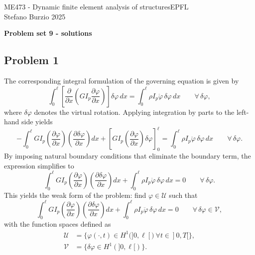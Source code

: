 \documentclass[12pt]{article}
\begin{document}
\noindent ME473 - Dynamic finite element analysis of structures\hfill EPFL\\
Stefano Burzio \hfill 2025\\
\vspace{0.3cm}

\hspace*{\fill}\textbf{\Large Problem set 9 - solutions}\hspace*{\fill}

\hrulefill

\subsection*{Problem 1}
The corresponding integral formulation of the governing equation is given by
\[
    \int_0^\ell \left[ \frac{\partial}{\partial x} \left(G I_p \frac{\partial \varphi}{\partial x} \right) \right] \delta\varphi \, dx = \int_0^\ell \rho I_p \ddot\varphi \, \delta\varphi \, dx \qquad \forall \, \delta\varphi,
\]
where \( \delta\varphi \) denotes the virtual rotation. Applying integration by parts to the left-hand side yields
\[
    -\int_0^\ell G I_p \left( \frac{\partial\varphi}{\partial x} \right) \left( \frac{\partial\delta\varphi}{\partial x} \right) dx
    + \left[ G I_p \left( \frac{\partial\varphi}{\partial x} \right) \delta\varphi \right]_0^\ell = \int_0^\ell \rho I_p \ddot\varphi \, \delta\varphi \, dx \qquad \forall \, \delta\varphi.
\]
By imposing natural boundary conditions that eliminate the boundary term, the expression simplifies to
\[
    \int_0^\ell G I_p \left( \frac{\partial\varphi}{\partial x} \right) \left( \frac{\partial\delta\varphi}{\partial x} \right) dx +
    \int_0^\ell \rho I_p \ddot\varphi \, \delta\varphi \, dx = 0 \qquad \forall \, \delta\varphi.
\]
This yields the weak form of the problem: find \( \varphi \in \mathcal{U} \) such that
\[
    \int_0^\ell G I_p \left( \frac{\partial\varphi}{\partial x} \right) \left( \frac{\partial\delta\varphi}{\partial x} \right) dx +
    \int_0^\ell \rho I_p \ddot\varphi \, \delta\varphi \, dx = 0 \qquad \forall \, \delta\varphi \in \mathcal{V},
\]
with the function spaces defined as
\begin{align*}
    \mathcal{U} & = \{ \varphi(\cdot,t) \in H^1(]0,\ell[)\ \forall t\in]0,T[ \}, \\
    \mathcal{V} & = \{\delta \varphi \in H^1(]0,\ell[)\}.
\end{align*}
\end{document}
